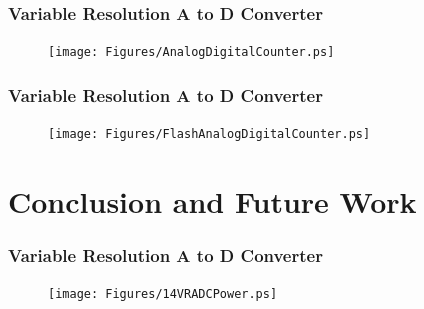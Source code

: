 

\begin{frame}
	\frametitle{Variable Resolution A to D Converter}  \footnotesize
	\begin{center}
		\begin{figure}
			\texttt{[image: Figures/AnalogDigitalCounter.ps]}\\
		\end{figure}
		\scriptsize{ \color{blue}{Block Diagram of the Variable Resolution ADC Using Up-Down Counter}}
	\end{center}
\end{frame}
\begin{frame}
	\frametitle{Variable Resolution A to D Converter}  \footnotesize
	\begin{center}
		\begin{figure}
			\texttt{[image: Figures/FlashAnalogDigitalCounter.ps]}\\
		\end{figure}
		\scriptsize{ \color{blue}{Block Diagram of the Variable Resolution ADC Using Flash ADC}}
	\end{center}
\end{frame}



\section{Conclusion and Future Work}
\begin{frame}
	\frametitle{Variable Resolution A to D Converter}  \footnotesize
	\begin{center}
		\begin{figure}
			\texttt{[image: Figures/14VRADCPower.ps]}\\
		\end{figure}
		\scriptsize{ \color{blue}{Block Diagram of the Proposed ADC Architecture for Variable Resolution}}
	\end{center}
\end{frame}





